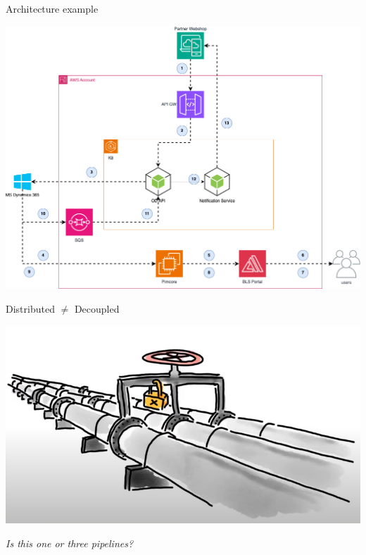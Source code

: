 \begin{frame}{Architecture example}
  \begin{center}
    \includegraphics[scale=.3]{./assets/od}
  \end{center}
\end{frame}


\begin{frame}{Distributed $\ne$ Decoupled}
  \begin{center}
    \includegraphics[scale=.43]{./assets/coupling}

    \textit{Is this one or three pipelines?}
  \end{center}
\end{frame}

